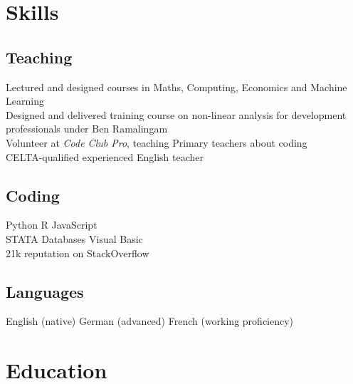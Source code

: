\documentclass[a4paper,nomath]{deedy-resume} %
\begin{document}
\begin{minipage}[t]{0.3\textwidth} %


    \section{Skills}

    \subsection{Teaching}
    \textbullet{} Lectured and designed courses in Maths, Computing, Economics and Machine Learning\\
    \textbullet{} Designed and delivered training course on non-linear analysis for development professionals under Ben Ramalingam\\
    \textbullet{} Volunteer at \textit{Code Club Pro}, teaching Primary teachers about coding\\
    \textbullet{} CELTA-qualified experienced English teacher\\
    
    \subsection{Coding}

    Python \textbullet{} R \textbullet{} JavaScript \\
    STATA \textbullet{} Databases \textbullet{} Visual Basic \\
    21k reputation on StackOverflow

    \sectionspace %

    \subsection{Languages}
    English (native) \textbullet{} German (advanced) \textbullet{} French (working proficiency)


    \section{Education} 
    

\end{minipage}
\end{document}
